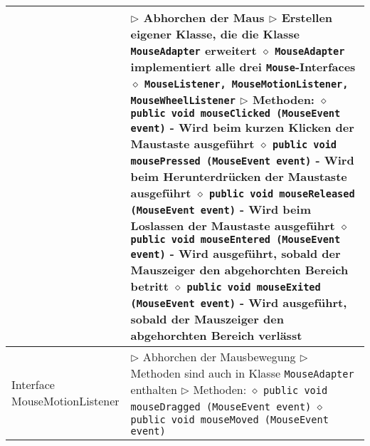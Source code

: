 \begin{longtable}{ | p{} p{} | }
	\makecell[l]{Interface MouseListener} & \makecell[l]{
	$\rhd$ Abhorchen der Maus \\
	$\rhd$ Erstellen eigener Klasse, die die Klasse \texttt{MouseAdapter} erweitert \\
	\hspace{0.4cm} $\diamond$ \texttt{MouseAdapter} implementiert alle drei \texttt{Mouse}-Interfaces \\
	\hspace{0.4cm} $\diamond$  \texttt{MouseListener, MouseMotionListener, MouseWheelListener} \\
	$\rhd$ Methoden: \\
	\hspace{0.4cm} $\diamond$ \texttt{public void mouseClicked (MouseEvent event)} \\
	\hspace{0.6cm} - Wird beim kurzen Klicken der Maustaste ausgeführt \\
	\hspace{0.4cm} $\diamond$ \texttt{public void mousePressed (MouseEvent event)} \\	
	\hspace{0.6cm} - Wird beim Herunterdrücken der Maustaste ausgeführt \\
	\hspace{0.4cm} $\diamond$ \texttt{public void mouseReleased (MouseEvent event)} \\
	\hspace{0.6cm} - Wird beim Loslassen der Maustaste ausgeführt \\
	\hspace{0.4cm} $\diamond$ \texttt{public void mouseEntered (MouseEvent event)} \\
	\hspace{0.6cm} - Wird ausgeführt, sobald der Mauszeiger den abgehorchten Bereich betritt \\
	\hspace{0.4cm} $\diamond$ \texttt{public void mouseExited (MouseEvent event)} \\
	\hspace{0.6cm} - Wird ausgeführt, sobald der Mauszeiger den abgehorchten Bereich verlässt} \\ \hline

	\makecell[l]{Interface \\ MouseMotionListener} & \makecell[l]{
	$\rhd$ Abhorchen der Mausbewegung \\
	$\rhd$ Methoden sind auch in Klasse \texttt{MouseAdapter} enthalten \\
	$\rhd$ Methoden: \\
	\hspace{0.4cm} $\diamond$ \texttt{public void mouseDragged (MouseEvent event)} \\
	\hspace{0.4cm} $\diamond$ \texttt{public void mouseMoved (MouseEvent event)}  } \\ \hline


\end{longtable}
